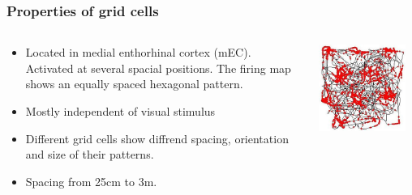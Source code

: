 \documentclass[mathserif]{beamer}
\begin{document}
\begin{frame}
\frametitle{Properties of grid cells}
\begin{columns}[T]
    \begin{column}{.5\textwidth}
			\begin{itemize}
			\item Located in  medial enthorhinal cortex (mEC). Activated at several spacial positions. The firing map shows an equally spaced hexagonal pattern. 
			\item Mostly independent of visual stimulus
			\item Different grid cells show diffrend spacing, orientation and size of their patterns.
			\item Spacing from 25cm to 3m. 
			\end{itemize}
    \end{column}
    \begin{column}{.5\textwidth}
    \includegraphics[width= 0.9\textwidth]{RatRunningPath.JPG}
    \end{column}
  \end{columns}	
\end{frame}
%
%
%
\end{document}
